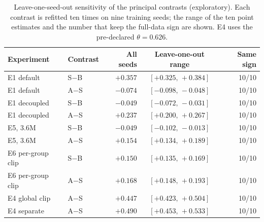 \begin{table}[H]
\caption{Leave-one-seed-out sensitivity of the principal contrasts (exploratory). Each contrast is refitted ten times on nine training seeds; the range of the ten point estimates and the number that keep the full-data sign are shown. E4 uses the pre-declared $\theta=0.626$.}
\label{tab:loso}
\centering\small
\begin{tabular}{@{}llrcr@{}}
\toprule
Experiment & Contrast & All seeds & Leave-one-out range & Same sign \\
\midrule
E1 default & S$-$B & $+0.357$ & $[+0.325,\,+0.384]$ & 10/10 \\
E1 default & A$-$S & $-0.074$ & $[-0.098,\,-0.048]$ & 10/10 \\
E1 decoupled & S$-$B & $-0.049$ & $[-0.072,\,-0.031]$ & 10/10 \\
E1 decoupled & A$-$S & $+0.237$ & $[+0.200,\,+0.267]$ & 10/10 \\
E5, 3.6M & S$-$B & $-0.049$ & $[-0.102,\,-0.013]$ & 10/10 \\
E5, 3.6M & A$-$S & $+0.154$ & $[+0.134,\,+0.189]$ & 10/10 \\
E6 per-group clip & S$-$B & $+0.150$ & $[+0.135,\,+0.169]$ & 10/10 \\
E6 per-group clip & A$-$S & $+0.168$ & $[+0.148,\,+0.193]$ & 10/10 \\
E4 global clip & A$-$S & $+0.447$ & $[+0.423,\,+0.504]$ & 10/10 \\
E4 separate & A$-$S & $+0.490$ & $[+0.453,\,+0.533]$ & 10/10 \\
\bottomrule
\end{tabular}
\end{table}
